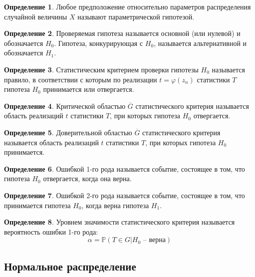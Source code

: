\documentclass[12pt]{article}
\theoremstyle{definition}
\newtheorem{definition}{Определение}
\newcommand{\prob}{\mathbb{P}}
\begin{document}
\begin{definition}
    Любое предположение относительно параметров распределения случайной величины $X$ называют параметрической гипотезой.
\end{definition}
\begin{definition}
    Проверяемая гипотеза называется основной (или нулевой) и обозначается $H_0$. Гипотеза, конкурирующая с $H_0$, называется альтернативной и обозначается $H_1$.
\end{definition}
\begin{definition}
    Статистическим критерием проверки гипотезы $H_0$ называется правило, в соответствии с которым по реализации $t=\varphi(z_n)$ статистики $T$ гипотеза $H_0$ принимается или отвергается.
\end{definition}
\begin{definition}
    Критической областью $\overline{G}$ статистического критерия называется область реализаций $t$ статистики $T$, при которых гипотеза $H_0$ отвергается.
\end{definition}
\begin{definition}
    Доверительной областью $\overline{G}$ статистического критерия называется область реализаций $t$ статистики $T$, при которых гипотеза $H_0$ принимается.
\end{definition}
\begin{definition}
    Ошибкой 1-го рода называется событие, состоящее в том, что гипотеза $H_0$ отвергается, когда она верна.
\end{definition}
\begin{definition}
    Ошибкой 2-го рода называется событие, состоящее в том, что принимается гипотеза $H_0$, когда верна гипотеза $H_1$.
\end{definition}
\begin{definition}
    Уровнем значимости статистического критерия называется вероятность ошибки 1-го рода:
    $$\alpha=\prob(T\in G|H_0\text{ – верна})$$
\end{definition}

\subsection{Нормальное распределение}
\end{document}
